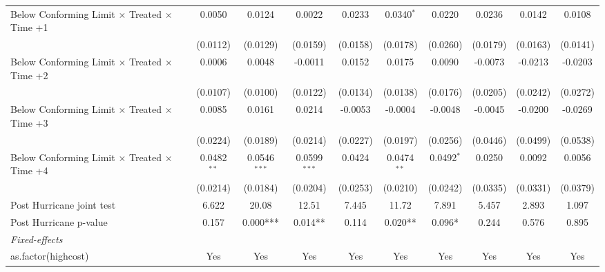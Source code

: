 \begin{tabular}{lccccccccc}
   Below Conforming Limit $\times$ Treated $\times$ Time +1   & 0.0050         & 0.0124         & 0.0022         & 0.0233   & 0.0340$^{*}$  & 0.0220       & 0.0236    & 0.0142        & 0.0108\\   
                                                              & (0.0112)       & (0.0129)       & (0.0159)       & (0.0158) & (0.0178)      & (0.0260)     & (0.0179)  & (0.0163)      & (0.0141)\\   
   Below Conforming Limit $\times$ Treated $\times$ Time +2   & 0.0006         & 0.0048         & -0.0011        & 0.0152   & 0.0175        & 0.0090       & -0.0073   & -0.0213       & -0.0203\\   
                                                              & (0.0107)       & (0.0100)       & (0.0122)       & (0.0134) & (0.0138)      & (0.0176)     & (0.0205)  & (0.0242)      & (0.0272)\\   
   Below Conforming Limit $\times$ Treated $\times$ Time +3   & 0.0085         & 0.0161         & 0.0214         & -0.0053  & -0.0004       & -0.0048      & -0.0045   & -0.0200       & -0.0269\\   
                                                              & (0.0224)       & (0.0189)       & (0.0214)       & (0.0227) & (0.0197)      & (0.0256)     & (0.0446)  & (0.0499)      & (0.0538)\\   
   Below Conforming Limit $\times$ Treated $\times$ Time +4   & 0.0482$^{**}$  & 0.0546$^{***}$ & 0.0599$^{***}$ & 0.0424   & 0.0474$^{**}$ & 0.0492$^{*}$ & 0.0250    & 0.0092        & 0.0056\\   
                                                              & (0.0214)       & (0.0184)       & (0.0204)       & (0.0253) & (0.0210)      & (0.0242)     & (0.0335)  & (0.0331)      & (0.0379)\\   
   Post Hurricane joint test                                  & 6.622          & 20.08          & 12.51          & 7.445    & 11.72         & 7.891        & 5.457     & 2.893         & 1.097\\  
   Post Hurricane p-value                                     & 0.157          & 0.000***       & 0.014**        & 0.114    & 0.020**       & 0.096*       & 0.244     & 0.576         & 0.895\\  
   \midrule
   \emph{Fixed-effects}\\
   as.factor(highcost)                                        & Yes            & Yes            & Yes            & Yes      & Yes           & Yes          & Yes       & Yes           & Yes\\  

\end{tabular}
